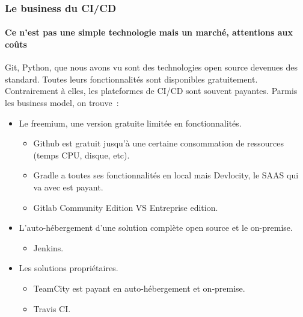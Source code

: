 \documentclass{beamer}
\begin{document}
    \begin{frame}
        \frametitle{Le business du CI/CD}
        \framesubtitle{Ce n'est pas une simple technologie mais un marché, attentions aux coûts}
        \transdissolve
        Git, Python, que nous avons vu sont des technologies open source devenues des standard.
        Toutes leurs fonctionnalités sont disponibles gratuitement.
        Contrairement à elles, les plateformes de CI/CD sont souvent payantes.
        \bigbreak
        Parmis les business model, on trouve~:
        \begin{itemize}
            \item Le freemium, une version gratuite limitée en fonctionnalités.
            \begin{itemize}
                \item Github est gratuit jusqu'à une certaine consommation de ressources (temps CPU, disque, etc).
                \item Gradle a toutes ses fonctionnalités en local mais Devlocity, le SAAS qui va avec est payant.
                \item Gitlab Community Edition VS Entreprise edition.
            \end{itemize}
            \item L'auto-hébergement d'une solution complète open source et le on-premise.
            \begin{itemize}
                \item Jenkins.
            \end{itemize}
            \item Les solutions propriétaires.
            \begin{itemize}
                \item TeamCity est payant en auto-hébergement et on-premise.
                \item Travis CI.
            \end{itemize}
        \end{itemize}
    \end{frame}
\end{document}
